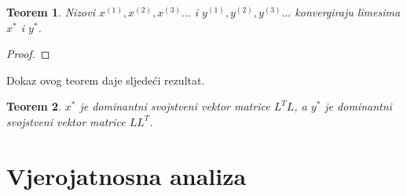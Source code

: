 \documentclass[11pt]{article}
\newtheorem{theorem}{Teorem}[section]
\begin{document}
\begin{theorem}
Nizovi $x^{(1)}, x^{(2)}, x^{(3)}\dots$ i $y^{(1)}, y^{(2)}, y^{(3)}\dots$ konvergiraju limesima $x^{*}$ i $y^{*}$.
\end{theorem}
\begin{proof}

\end{proof}

Dokaz ovog teorem daje sljedeći rezultat.
\begin{theorem}
$x^{*}$ je dominantni svojstveni vektor matrice $L^{T}L$, a $y^{*}$ je dominantni svojstveni vektor matrice $LL^{T}$.
\end{theorem}

\section{Vjerojatnosna analiza}
\end{document}
